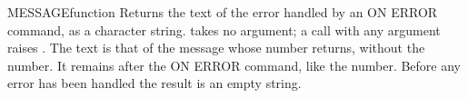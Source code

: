 \begin{XbaseEntry}{MESSAGE}{function}
Returns the text of the error handled by an ON ERROR command, as a character string.
\Syntax
{}
\Usage
{} takes no argument; a call with any argument raises . The text is that of the message whose number  returns, without the number. It remains after the ON ERROR command, like the number. Before any error has been handled the result is an empty string.
\Examples
{}
\end{XbaseEntry}

